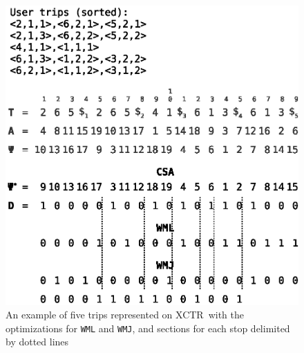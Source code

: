 \documentclass[runningheads]{llncs}
\newcommand{\ctr}{XCTR}
\begin{document}
\begin{figure}[hbt!]
\includegraphics[width=\textwidth]{example_trips.eps}
\caption{An example of five trips represented on \ctr~with the optimizations for \texttt{WML} and \texttt{WMJ}, and sections for each stop delimited by dotted lines}
\label{fig:example_ctr}
\end{figure}
\end{document}
